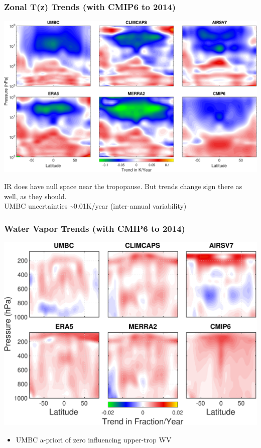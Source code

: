 \documentclass[10pt,t]{beamer}
\begin{document}
\begin{frame}
\frametitle{Zonal T(z) Trends (with CMIP6 to 2014)}  
\vspace{-0.15in}
\begin{center}
\includegraphics[width=\linewidth]{SunClimate2022/zonal_trates_1to1000mbar_cmip6_newcaxis.pdf}
\end{center}

\footnotesize
IR does have null space near the tropopause.  But trends change sign there as well, as they should.\\
\vspace{0.1in}
UMBC uncertainties \textasciitilde{}0.01K/year (inter-annual variability)
\end{frame}
\begin{frame}
\frametitle{Water Vapor Trends (with CMIP6 to 2014)}  
\vspace{-0.15in}
\begin{center}
\includegraphics[width=0.85\linewidth]{./Figslls/tiled_all_N_WV_trend_without_mls_start_with_cmip6.pdf}
\end{center}

\small
\begin{itemize}
\item UMBC a-priori of zero influencing upper-trop WV
\end{itemize}
\end{frame}
\end{document}
